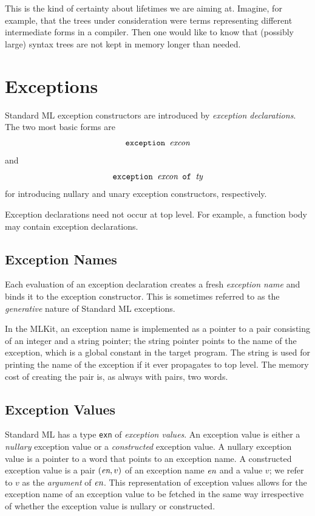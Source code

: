 \documentclass[12pt]{book}
\begin{document}
This is the kind of certainty about lifetimes we are aiming at.
Imagine, for example, that the trees under consideration were terms
representing different intermediate forms in a compiler. Then one
would like to know that (possibly large) syntax trees are not kept in
memory longer than needed.

\chapter{Exceptions}
\label{exceptions.sec}

Standard ML
%
%
exception constructors are introduced by
%
% 
{\em exception declarations}. The two most basic forms are
$$\hbox{\tt exception {\it excon}}$$
and 
$$\hbox{\tt exception {\it excon} of {\it ty}}$$
for introducing nullary
and unary exception constructors, respectively.

Exception declarations need not occur at top level. For example, a
function body may contain exception declarations. 

\section{Exception Names}
Each evaluation of an exception declaration creates a fresh
%
%
{\em exception name\/} and binds it to the exception constructor. This
is sometimes referred to as the {\em generative\/} nature of Standard
ML exceptions.

In the MLKit, an exception name is implemented as a pointer to a pair
consisting of an integer and a string pointer; the string pointer
points to the name of the exception, which is a global constant in the
target program. The string is used for printing the name of the
exception if it ever propagates to top level. The memory cost of
creating the pair is, as always with pairs, two words.

\section{Exception Values}
Standard ML has a type 
%
{\tt exn} of 
%
{\em exception values}.  An exception value is either a
%
{\em nullary\/} exception value or a 
%
{\em constructed\/} exception value. A nullary exception value is a
pointer to a word that points to an exception name. A constructed
exception value is a pair $(\hbox{\it en},v)$ of an exception name $\hbox{\it en}$
and a value $v$; we refer to $v$ as the {\em argument\/} of $\hbox{\it en}$.
This representation of exception values allows for the exception name
of an exception value to be fetched in the same way irrespective of
whether the exception value is nullary or constructed.
\end{document}
